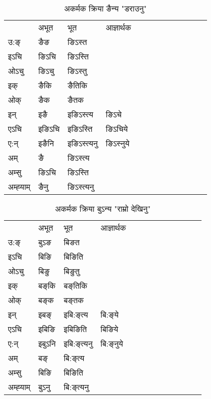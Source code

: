 \begin{table}[H]
\centering
\caption{\label{in.vi} अकर्मक क्रिया  ङैन्य  "डराउनु"  }
\begin{tabular}{l|l|l|l|l|l|l|l|l|l|l|l|l}  \toprule
&अभूत & भूत & आज्ञार्थक \\ 
उ:ङ्‌ &ङैङ &ङिऽस्त \\ 
इऽचि &ङिऽचि &ङिऽस्ति   \\ 
ओऽचु &ङिऽचु &ङिऽस्तु   \\ 
इक् &ङैकि &ङैतिकि   \\ 
ओक् &ङैक &ङैतक   \\ 
इन् & इङै & इङिऽस्त्य &ङिऽचे  \\ 
एऽचि & इङिऽचि & इङिऽस्ति &ङिऽचिये    \\ 
ए:न् & इङैनि  & इङिऽस्त्यनु &ङिऽस्‍नुये  \\ 
अम् & ङै & ङिऽस्त्य   \\ 
अम्सु & ङिऽचि & ङिऽस्ति   \\ 
अम्ह्‍याम् & ङैनु  & ङिऽस्त्यनु \\ 
\bottomrule
\end{tabular}
\end{table}


\begin{table}[H]
\centering
\caption{\label{iŋ.vi} अकर्मक क्रिया  बुऽन्य  "राम्रो देखिनु"  }
\begin{tabular}{l|l|l|l|l|l|l|l|l|l|l|l|l}  \toprule
&अभूत & भूत & आज्ञार्थक \\ 
उ:ङ्‌ &बुऽङ &बिङत \\ 
इऽचि &बिङि &बिङिति   \\ 
ओऽचु &बिङु &बिङुतु   \\ 
इक् &बङ्‌कि &बङ्‌तिकि   \\ 
ओक् &बङ्‌क &बङ्‌तक   \\ 
इन् & इबङ्‌ & इबि:ङ्‌त्य &बि:ङ्‌ये  \\ 
एऽचि & इबिङि & इबिङिति &बिङिये    \\ 
ए:न् & इबुऽनि  & इबि:ङ्‌त्यनु &बि:ङ्‌नुये  \\ 
अम् & बङ्‌ & बि:ङ्‌त्य   \\ 
अम्सु & बिङि & बिङिति   \\ 
अम्ह्‍याम् & बुऽनु  & बि:ङ्‌त्यनु \\ 
\bottomrule
\end{tabular}
\end{table}




